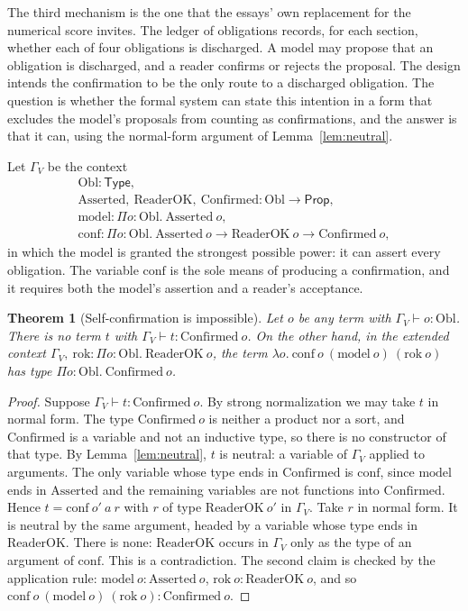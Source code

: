 \documentclass[11pt]{article}
\theoremstyle{plain}
\newtheorem{theorem}{Theorem}[section]
\theoremstyle{definition}
\theoremstyle{remark}
\newcommand{\Prp}{\mathsf{Prop}}
\newcommand{\Typ}{\mathsf{Type}}
\begin{document}
The third mechanism is the one that the essays' own replacement for the numerical score invites. The ledger of obligations records, for each section, whether each of four obligations is discharged. A model may propose that an obligation is discharged, and a reader confirms or rejects the proposal. The design intends the confirmation to be the only route to a discharged obligation. The question is whether the formal system can state this intention in a form that excludes the model's proposals from counting as confirmations, and the answer is that it can, using the normal-form argument of Lemma~\ref{lem:neutral}.

Let $\Gamma_V$ be the context
\[
\begin{array}{l}
\mathrm{Obl} : \Typ,\\
\mathrm{Asserted},\ \mathrm{ReaderOK},\ \mathrm{Confirmed} : \mathrm{Obl}\to\Prp,\\
\mathrm{model} : \Pi o{:}\mathrm{Obl}.\ \mathrm{Asserted}\ o,\\
\mathrm{conf} : \Pi o{:}\mathrm{Obl}.\ \mathrm{Asserted}\ o\to\mathrm{ReaderOK}\ o\to\mathrm{Confirmed}\ o,
\end{array}
\]
in which the model is granted the strongest possible power: it can assert every obligation. The variable $\mathrm{conf}$ is the sole means of producing a confirmation, and it requires both the model's assertion and a reader's acceptance.

\begin{theorem}[Self-confirmation is impossible]\label{thm:selfconf}
Let $o$ be any term with $\Gamma_V\vdash o:\mathrm{Obl}$. There is no term $t$ with $\Gamma_V\vdash t:\mathrm{Confirmed}\ o$. On the other hand, in the extended context $\Gamma_V,\ \mathrm{rok}:\Pi o{:}\mathrm{Obl}.\ \mathrm{ReaderOK}\ o$, the term $\lambda o.\ \mathrm{conf}\ o\ (\mathrm{model}\ o)\ (\mathrm{rok}\ o)$ has type $\Pi o{:}\mathrm{Obl}.\ \mathrm{Confirmed}\ o$.
\end{theorem}

\begin{proof}
Suppose $\Gamma_V\vdash t:\mathrm{Confirmed}\ o$. By strong normalization we may take $t$ in normal form. The type $\mathrm{Confirmed}\ o$ is neither a product nor a sort, and $\mathrm{Confirmed}$ is a variable and not an inductive type, so there is no constructor of that type. By Lemma~\ref{lem:neutral}, $t$ is neutral: a variable of $\Gamma_V$ applied to arguments. The only variable whose type ends in $\mathrm{Confirmed}$ is $\mathrm{conf}$, since $\mathrm{model}$ ends in $\mathrm{Asserted}$ and the remaining variables are not functions into $\mathrm{Confirmed}$. Hence $t=\mathrm{conf}\ o'\ a\ r$ with $r$ of type $\mathrm{ReaderOK}\ o'$ in $\Gamma_V$. Take $r$ in normal form. It is neutral by the same argument, headed by a variable whose type ends in $\mathrm{ReaderOK}$. There is none: $\mathrm{ReaderOK}$ occurs in $\Gamma_V$ only as the type of an argument of $\mathrm{conf}$. This is a contradiction. The second claim is checked by the application rule: $\mathrm{model}\ o:\mathrm{Asserted}\ o$, $\mathrm{rok}\ o:\mathrm{ReaderOK}\ o$, and so $\mathrm{conf}\ o\ (\mathrm{model}\ o)\ (\mathrm{rok}\ o):\mathrm{Confirmed}\ o$. \qedhere
\end{proof}
\end{document}
